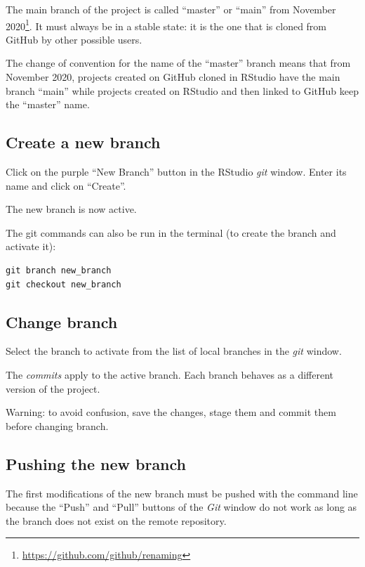 \documentclass[
  12pt,
  american,
  a4paper,
  extrafontsizes,onecolumn,openright
  ]{memoir}
\begin{document}
The main branch of the project is called \enquote{master} or \enquote{main} from November 2020\footnote{\url{https://github.com/github/renaming}}.
It must always be in a stable state: it is the one that is cloned from GitHub by other possible users.

The change of convention for the name of the \enquote{master} branch means that from November 2020, projects created on GitHub cloned in RStudio have the main branch \enquote{main} while projects created on RStudio and then linked to GitHub keep the \enquote{master} name.

\subsection{Create a new branch}\label{create-a-new-branch}

Click on the purple \enquote{New Branch} button in the RStudio \emph{git} window.
Enter its name and click on \enquote{Create}.

The new branch is now active.

The git commands can also be run in the terminal (to create the branch and activate it):

\begin{verbatim}
git branch new_branch
git checkout new_branch
\end{verbatim}

\subsection{Change branch}\label{change-branch}

Select the branch to activate from the list of local branches in the \emph{git} window.

The \emph{commits} apply to the active branch.
Each branch behaves as a different version of the project.

Warning: to avoid confusion, save the changes, stage them and commit them before changing branch.

\subsection{Pushing the new branch}\label{pushing-the-new-branch}

The first modifications of the new branch must be pushed with the command line because the \enquote{Push} and \enquote{Pull} buttons of the \emph{Git} window do not work as long as the branch does not exist on the remote repository.
\end{document}
